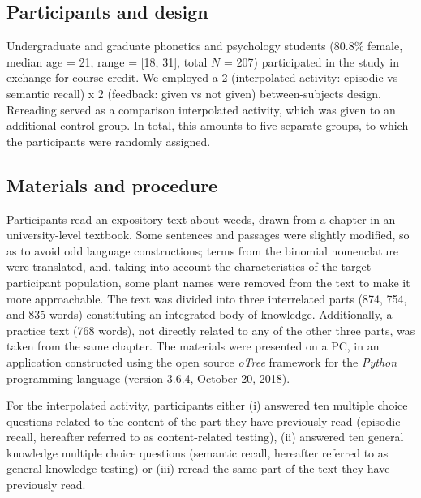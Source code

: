 \documentclass[
  11pt,
]{article}
\date{}
\begin{document}
\hypertarget{participants-and-design}{%
\subsection{Participants and design}\label{participants-and-design}}

Undergraduate and graduate phonetics and psychology students (80.8\%
female, median age = 21, range = {[}18, 31{]}, total \(N\) = 207)
participated in the study in exchange for course credit. We employed a 2
(interpolated activity: episodic vs semantic recall) x 2 (feedback:
given vs not given) between-subjects design. Rereading served as a
comparison interpolated activity, which was given to an additional
control group. In total, this amounts to five separate groups, to which
the participants were randomly assigned.

\hypertarget{materials-and-procedure}{%
\subsection{Materials and procedure}\label{materials-and-procedure}}

Participants read an expository text about weeds, drawn from a chapter
in an university-level textbook. Some sentences and passages were
slightly modified, so as to avoid odd language constructions; terms from
the binomial nomenclature were translated, and, taking into account the
characteristics of the target participant population, some plant names
were removed from the text to make it more approachable. The text was
divided into three interrelated parts (874, 754, and 835 words)
constituting an integrated body of knowledge. Additionally, a practice
text (768 words), not directly related to any of the other three parts,
was taken from the same chapter. The materials were presented on a PC,
in an application constructed using the open source \textit{oTree}
framework \citep[version 2.1.35,][]{chenOTreeOpensourcePlatform2016} for
the \textit{Python} programming language (version 3.6.4, October 20,
2018).

For the interpolated activity, participants either (i) answered ten
multiple choice questions related to the content of the part they have
previously read (episodic recall, hereafter referred to as
content-related testing), (ii) answered ten general knowledge multiple
choice questions (semantic recall, hereafter referred to as
general-knowledge testing) or (iii) reread the same part of the text
they have previously read.
\end{document}
